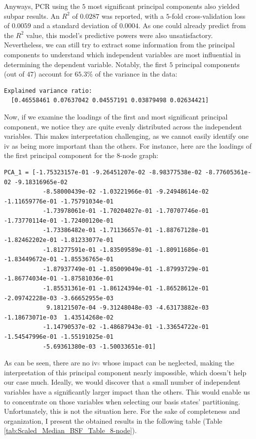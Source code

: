 Anyways, PCR using the $5$ most significant principal components also yielded subpar results. An $R^2$ of $0.0287$ was reported, with a $5$-fold cross-validation loss of $0.0059$ and a standard deviation of $0.0004$. As one could already predict from the $R^2$ value, this model's predictive powers were also unsatisfactory. Nevertheless, we can still try to extract some information from the principal components to understand which independent variables are most influential in determining the dependent variable. Notably, the first $5$ principal components (out of $47$) account for $65.3\%$ of the variance in the data:
\begin{lstlisting}[caption={Explained variance ratio, for the first $5$ \acrshort{pc}\textcolor{gray}{s} ($8$-node graph).}, captionpos=b, style=DOS]
  Explained variance ratio:
  [0.46558461 0.07637042 0.04557191 0.03879498 0.02634421]
\end{lstlisting}
Now, if we examine the loadings of the first and most significant principal component, we notice they are quite evenly distributed across the independent variables. This makes interpretation challenging, as we cannot easily identify one \acrshort{iv} as being more important than the others. For instance, here are the loadings of the first principal component for the $8$-node graph:
\begin{lstlisting}[caption={Loadings of the first \acrshort{pc}, for the $8$-node graph.}, captionpos=b, style=DOS]
  PCA_1 = [-1.75323157e-01 -9.26451207e-02 -8.98377538e-02 -8.77605361e-02 -9.18316965e-02
           -8.58000439e-02 -1.03221966e-01 -9.24948614e-02 -1.11659776e-01 -1.75791034e-01
           -1.73978061e-01 -1.70204027e-01 -1.70707746e-01 -1.73770114e-01 -1.72400120e-01
           -1.73386482e-01 -1.71136657e-01 -1.88767128e-01 -1.82462202e-01 -1.81233077e-01
           -1.81277591e-01 -1.83509589e-01 -1.80911686e-01 -1.83449672e-01 -1.85536765e-01
           -1.87937749e-01 -1.85009049e-01 -1.87993729e-01 -1.86774034e-01 -1.87581036e-01
           -1.85531361e-01 -1.86124394e-01 -1.86528612e-01 -2.09742228e-03 -3.66652955e-03
            9.18121507e-04 -9.31248048e-03 -4.63173882e-03 -1.18673071e-03  1.43514268e-02
           -1.14790537e-02 -1.48687943e-01 -1.33654722e-01 -1.54547996e-01 -1.55191025e-01
           -5.69361380e-03 -1.50033651e-01]
  \end{lstlisting}
As can be seen, there are no \acrshort{iv}\textcolor{gray}{s} whose impact can be neglected, making the interpretation of this principal component nearly impossible, which doesn't help our case much. Ideally, we would discover that a small number of independent variables have a significantly larger impact than the others. This would enable us to concentrate on those variables when selecting our basis states' partitioning. Unfortunately, this is not the situation here. For the sake of completeness and organization, I present the obtained results in the following table (Table \ref{tab:Scaled_Median_BSF_Table_8-node}).

